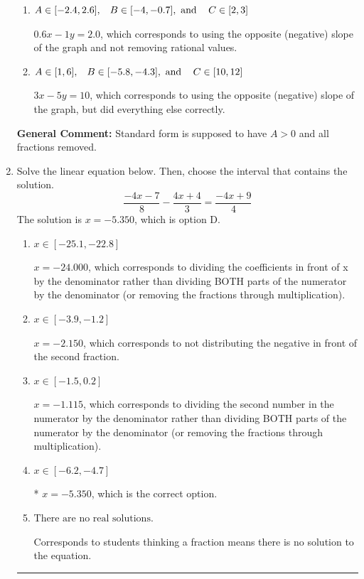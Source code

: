 \documentclass{extbook}[14pt]
\newcommand{\litem}[1]{\item #1

\rule{\textwidth}{0.4pt}}
\begin{document}
\begin{enumerate}
{\begin{enumerate}[label=\Alph*.]
 $-3x - 5y = 10$, which corresponds to not making $A$ positive (by multiplying the equation by $-1$).
\item \( A \in [-2.4, 2.6], \hspace{3mm} B \in [-4, -0.7], \text{ and } \hspace{3mm} C \in [2, 3] \)

 $0.6x - 1y = 2.0$, which corresponds to using the opposite (negative) slope of the graph and not removing rational values.
\item \( A \in [1, 6], \hspace{3mm} B \in [-5.8, -4.3], \text{ and } \hspace{3mm} C \in [10, 12] \)

 $3x - 5y = 10$, which corresponds to using the opposite (negative) slope of the graph, but did everything else correctly.
\end{enumerate}

\textbf{General Comment:} Standard form is supposed to have $A > 0$ and all fractions removed.
}
\litem{
Solve the linear equation below. Then, choose the interval that contains the solution.
\[ \frac{-4x -7}{8} - \frac{4x + 4}{3} = \frac{-4x + 9}{4} \]The solution is \( x = -5.350 \), which is option D.\begin{enumerate}[label=\Alph*.]
\item \( x \in [-25.1, -22.8] \)

 $x = -24.000$, which corresponds to dividing the coefficients in front of x by the denominator rather than dividing BOTH parts of the numerator by the denominator (or removing the fractions through multiplication).
\item \( x \in [-3.9, -1.2] \)

 $x = -2.150$, which corresponds to not distributing the negative in front of the second fraction.
\item \( x \in [-1.5, 0.2] \)

 $x = -1.115$, which corresponds to dividing the second number in the numerator by the denominator rather than dividing BOTH parts of the numerator by the denominator (or removing the fractions through multiplication).
\item \( x \in [-6.2, -4.7] \)

* $x = -5.350$, which is the correct option.
\item \( \text{There are no real solutions.} \)

Corresponds to students thinking a fraction means there is no solution to the equation.
\end{enumerate}

}
\end{enumerate}
\end{document}
